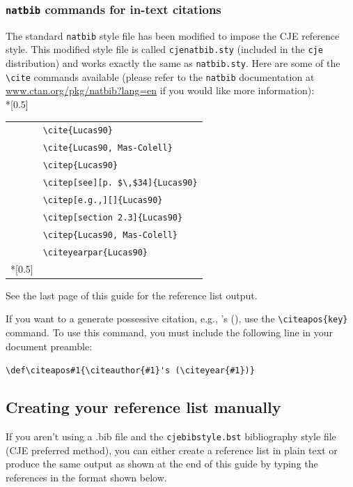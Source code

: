 \documentclass{cje}          %
\theoremstyle{plain}%
\theoremstyle{definition}
\theoremstyle{remark}
\def\citeapos#1{\citeauthor{#1}'s (\citeyear{#1})}
\begin{document}
\subsubsection{\texttt{natbib} commands for in-text citations}
The standard \texttt{natbib} style file has been modified to impose the CJE reference style. This modified style file is called \texttt{cjenatbib.sty} (included in the \texttt{cje} distribution) and works exactly the same as \texttt{natbib.sty}. Here are some of the \verb"\cite" commands  available (please refer to the \texttt{natbib} documentation at \url{www.ctan.org/pkg/natbib?lang=en}  if you would like more information):\\*[0.5\baselineskip]
\begin{tabular}{@{}ll}
\cite{Lucas90}
    & \indexsize\verb"\cite{Lucas90}"\\
\cite{Lucas90, Mas-Colell}
    & \indexsize\verb"\cite{Lucas90, Mas-Colell}"\\
\citep{Lucas90}
   & \indexsize\verb"\citep{Lucas90}"\\
\citep[see][p. $\,$34]{Lucas90}
   & \indexsize\verb"\citep[see][p. $\,$34]{Lucas90}"\\
\citep[e.g.,][]{Lucas90}
   & \indexsize\verb"\citep[e.g.,][]{Lucas90}"\\
\citep[section 2.3]{Lucas90}
   & \indexsize\verb"\citep[section 2.3]{Lucas90}"\\
\citep{Lucas90, Mas-Colell}
   & \indexsize\verb"\citep{Lucas90, Mas-Colell}"\\
\citeyearpar{Lucas90}
   & \indexsize\verb"\citeyearpar{Lucas90}"\\*[0.5\baselineskip]
\end{tabular}

\noindent See the last page of this guide for the reference list output.

If you want to a generate possessive citation, e.g., \citeapos{Lucas90}, use the \verb"\citeapos{key}" command.  To use this  command, you must include the following line in your document preamble:

 \verb"\def\citeapos#1{\citeauthor{#1}'s (\citeyear{#1})}"

\subsection{Creating your reference list manually}
If you aren't using a .bib file and the \texttt{cjebibstyle.bst} bibliography style file (CJE preferred method), you can either create a reference list in plain text or produce the same output as shown at the end of this guide by typing the references in the format shown below. \\
\end{document}
